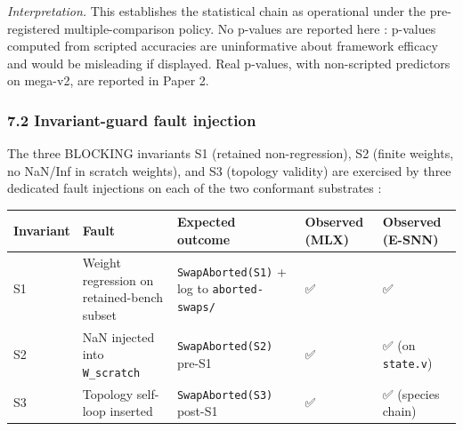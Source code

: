 \documentclass[
]{article}
\newcounter{none} %
\begin{document}
\emph{Interpretation.} This establishes the statistical chain as
operational under the pre-registered multiple-comparison policy. No
p-values are reported here : p-values computed from scripted accuracies
are uninformative about framework efficacy and would be misleading if
displayed. Real p-values, with non-scripted predictors on mega-v2, are
reported in Paper 2.

\subsubsection{7.2 Invariant-guard fault
injection}\label{invariant-guard-fault-injection}

The three BLOCKING invariants S1 (retained non-regression), S2 (finite
weights, no NaN/Inf in scratch weights), and S3 (topology validity) are
exercised by three dedicated fault injections on each of the two
conformant substrates :

{\def\LTcaptype{none} %
\begin{longtable}[]{@{}
  >{\raggedright\arraybackslash}p{}
  >{\raggedright\arraybackslash}p{}
  >{\raggedright\arraybackslash}p{}
  >{\raggedright\arraybackslash}p{}
  >{\raggedright\arraybackslash}p{}@{}}
\toprule\noalign{}
\begin{minipage}[b]{\linewidth}\raggedright
Invariant
\end{minipage} & \begin{minipage}[b]{\linewidth}\raggedright
Fault
\end{minipage} & \begin{minipage}[b]{\linewidth}\raggedright
Expected outcome
\end{minipage} & \begin{minipage}[b]{\linewidth}\raggedright
Observed (MLX)
\end{minipage} & \begin{minipage}[b]{\linewidth}\raggedright
Observed (E-SNN)
\end{minipage} \\
\midrule\noalign{}
\endhead
\bottomrule\noalign{}
\endlastfoot
S1 & Weight regression on retained-bench subset &
\texttt{SwapAborted(S1)} + log to \texttt{aborted-swaps/} & ✅ & ✅ \\
S2 & NaN injected into \texttt{W\_scratch} & \texttt{SwapAborted(S2)}
pre-S1 & ✅ & ✅ (on \texttt{state.v}) \\
S3 & Topology self-loop inserted & \texttt{SwapAborted(S3)} post-S1 & ✅
& ✅ (species chain) \\
\end{longtable}
}
\end{document}
